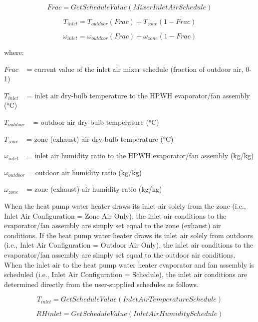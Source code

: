 \begin{equation}
Frac = GetScheduleValue(MixerInletAirSchedule)
\end{equation}

\begin{equation}
{T_{inlet}} = {T_{outdoor}}\left( {Frac} \right) + {T_{zone}}\left( {1 - Frac} \right)
\end{equation}

\begin{equation}
{\omega_{inlet}} = {\omega_{outdoor}}\left( {Frac} \right) + {\omega_{zone}}\left( {1 - Frac} \right)
\end{equation}

where:

\(Frac\) ~ = current value of the inlet air mixer schedule (fraction of outdoor air, 0-1)

\({T_{inlet}}\) ~ = inlet air dry-bulb temperature to the HPWH evaporator/fan assembly (°C)

\({T_{outdoor}}\) ~ = outdoor air dry-bulb temperature (°C)

\({T_{zone}}\) ~ = zone (exhaust) air dry-bulb temperature (°C)

\({\omega_{inlet}}\) ~ = inlet air humidity ratio to the HPWH evaporator/fan assembly (kg/kg)

\({\omega_{outdoor}}\) = outdoor air humidity ratio (kg/kg)

\({\omega_{zone}}\) ~ = zone (exhaust) air humidity ratio (kg/kg)

When the heat pump water heater draws its inlet air solely from the zone (i.e., Inlet Air Configuration = Zone Air Only), the inlet air conditions to the evaporator/fan assembly are simply set equal to the zone (exhaust) air conditions. If the heat pump water heater draws its inlet air solely from outdoors (i.e., Inlet Air Configuration = Outdoor Air Only), the inlet air conditions to the evaporator/fan assembly are simply set equal to the outdoor air conditions. When the inlet air to the heat pump water heater evaporator and fan assembly is scheduled (i.e., Inlet Air Configuration = Schedule), the inlet air conditions are determined directly from the user-supplied schedules as follows.

\begin{equation}
{T_{inlet}} = GetScheduleValue(InletAirTemperatureSchedule)
\end{equation}

\begin{equation}
RHinlet = GetScheduleValue(InletAirHumiditySchedule)
\end{equation}

